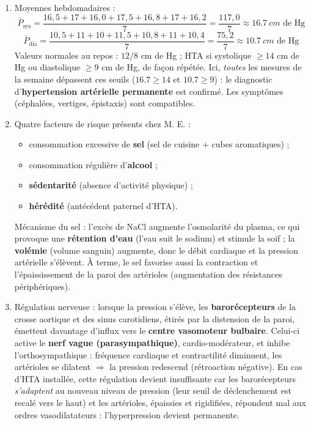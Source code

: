 \documentclass[11pt]{article}
\begin{document}
\begin{corrige}
\begin{enumerate}
\item Moyennes hebdomadaires :
\[ \bar{P}_{\text{sys}} = \frac{16{,}5 + 17 + 16{,}0 + 17{,}5 + 16{,}8 + 17 + 16{,}2}{7} = \frac{117{,}0}{7} \approx \SI{16,7}{cm} \text{ de Hg} \]
\[ \bar{P}_{\text{dia}} = \frac{10{,}5 + 11 + 10 + 11{,}5 + 10{,}8 + 11 + 10{,}4}{7} = \frac{75{,}2}{7} \approx \SI{10,7}{cm} \text{ de Hg} \]
Valeurs normales au repos : $12/8$ cm de Hg ; HTA si systolique $\geq 14$ cm de Hg ou diastolique $\geq 9$ cm de Hg, de façon répétée. Ici, \emph{toutes} les mesures de la semaine dépassent ces seuils ($\num{16,7} \geq 14$ et $\num{10,7} \geq 9$) : le diagnostic d'\textbf{hypertension artérielle permanente} est confirmé. Les symptômes (céphalées, vertiges, épistaxis) sont compatibles.
\item Quatre facteurs de risque présents chez M. E. :
\begin{itemize}
\item consommation excessive de \textbf{sel} (sel de cuisine + cubes aromatiques) ;
\item consommation régulière d'\textbf{alcool} ;
\item \textbf{sédentarité} (absence d'activité physique) ;
\item \textbf{hérédité} (antécédent paternel d'HTA).
\end{itemize}
Mécanisme du sel : l'excès de NaCl augmente l'osmolarité du plasma, ce qui provoque une \textbf{rétention d'eau} (l'eau suit le sodium) et stimule la soif ; la \textbf{volémie} (volume sanguin) augmente, donc le débit cardiaque et la pression artérielle s'élèvent. À terme, le sel favorise aussi la contraction et l'épaississement de la paroi des artérioles (augmentation des résistances périphériques).
\item Régulation nerveuse : lorsque la pression s'élève, les \textbf{barorécepteurs} de la crosse aortique et des sinus carotidiens, étirés par la distension de la paroi, émettent davantage d'influx vers le \textbf{centre vasomoteur bulbaire}. Celui-ci active le \textbf{nerf vague (parasympathique)}, cardio-modérateur, et inhibe l'orthosympathique : fréquence cardiaque et contractilité diminuent, les artérioles se dilatent $\Rightarrow$ la pression redescend (rétroaction négative). En cas d'HTA installée, cette régulation devient insuffisante car les barorécepteurs \emph{s'adaptent} au nouveau niveau de pression (leur seuil de déclenchement est \og recalé \fg{} vers le haut) et les artérioles, épaissies et rigidifiées, répondent mal aux ordres vasodilatateurs : l'hyperpression devient permanente.

\end{enumerate}
\end{corrige}
\end{document}
